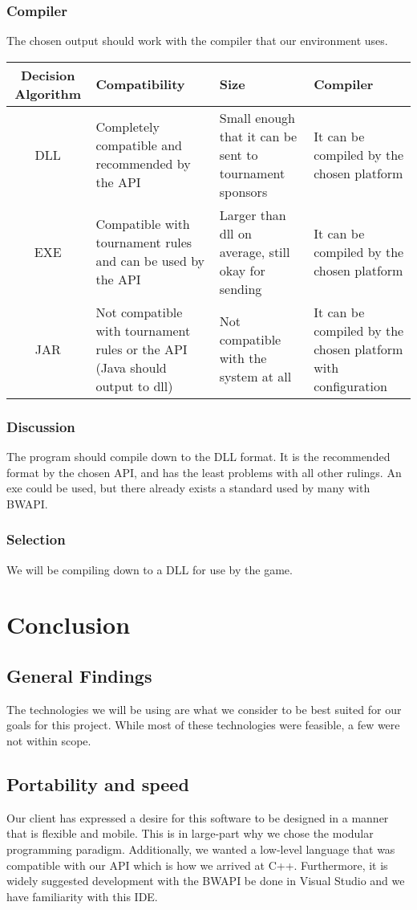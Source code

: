 \subsubsection{Compiler}
The chosen output should work with the compiler that our environment uses.
\begin{center}
	\begin{tabular}{ ||C|M|M|M|| } 
		\hline
		Decision Algorithm & Compatibility & Size & Compiler \\
		\hline
		DLL & Completely compatible and recommended by the API & Small enough that it can be sent to tournament sponsors & It can be compiled by the chosen platform \\ 
		\hline
		EXE & Compatible with tournament rules and can be used by the API & Larger than dll on average, still okay for sending & It can be compiled by the chosen platform \\ 
		\hline
		JAR & Not compatible with tournament rules or the API (Java should output to dll) &Not compatible with the system at all & It can be compiled by the chosen platform with configuration \\ 
		\hline
	\end{tabular}
\end{center}
\subsubsection{Discussion}
The program should compile down to the DLL format. It is the recommended format by the chosen API, and has the least problems with all other rulings. An exe could be used, but there already exists a standard used by many with BWAPI.
\subsubsection{Selection}
We will be compiling down to a DLL for use by the game.

\section{Conclusion}
\subsection{General Findings}
The technologies we will be using are what we consider to be best suited for our goals for this project. While most of these technologies were feasible, a few were not within scope. 

\subsection{Portability and speed}
Our client has expressed a desire for this software to be designed in a manner that is flexible and mobile. This is in large-part why we chose the modular programming paradigm. Additionally, we wanted a low-level language that was compatible with our API which is how we arrived at C++. Furthermore, it is widely suggested development with the BWAPI be done in Visual Studio and we have familiarity with this IDE.

